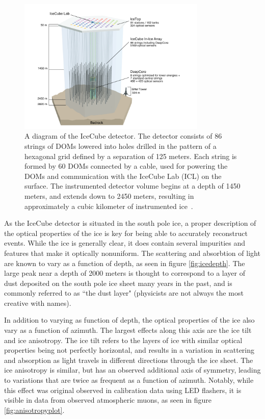 \begin{figure}[h]
\centering
\includegraphics[width=0.8\textwidth]{figs/icdiagram.png}
\caption{A diagram of the IceCube detector. The detector consists of 86 strings of DOMs lowered into holes drilled in the pattern of a hexagonal grid defined by a separation of 125 meters. Each string is formed by 60 DOMs connected by a cable, used for powering the DOMs and communication with the IceCube Lab (ICL) on the surface. The instrumented detector volume begins at a depth of 1450 meters, and extends down to 2450 meters, resulting in approximately a cubic kilometer of instrumented ice~\cite{det_paper}. }
\label{fig:icecubediagram}
\end{figure}

As the IceCube detector is situated in the south pole ice, a proper description of the optical properties of the ice is key for being able to accurately reconstruct events. While the ice is generally clear, it does contain several impurities and features that make it optically nonuniform. The scattering and absorbtion of light are known to vary as a function of depth, as seen in figure \ref{fig:icedepth}. The large peak near a depth of 2000 meters is thought to correspond to a layer of dust deposited on the south pole ice sheet many years in the past, and is commonly referred to as ``the dust layer" (physicists are not always the most creative with names). 

In addition to varying as function of depth, the optical properties of the ice also vary as a function of azimuth. The largest effects along this axis are the ice tilt and ice anisotropy. The ice tilt refers to the layers of ice with similar optical properties being not perfectly horizontal, and results in a variation in scattering and absorption as light travels in different directions through the ice sheet. The ice anisotropy is similar, but has an observed additional axis of symmetry, leading to variations that are twice as frequent as a function of azimuth. Notably, while this effect was original observed in calibration data using LED flashers, it is visible in data from observed atmospheric muons, as seen in figure \ref{fig:anisotropyplot}. 

